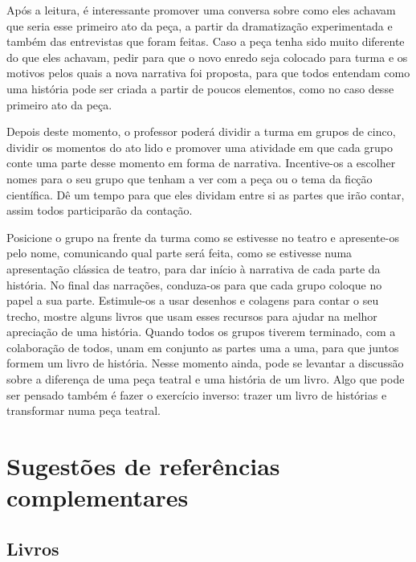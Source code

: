 \documentclass[11pt]{extarticle}
\begin{document}
Após a leitura, é interessante promover uma conversa sobre como eles achavam que seria esse primeiro ato da peça, a partir da dramatização experimentada e também das entrevistas que foram feitas. Caso a peça tenha sido muito diferente do que eles achavam, pedir para que o novo enredo seja colocado para turma e os motivos pelos quais a nova narrativa foi proposta, para que todos entendam como uma história pode ser criada a partir de poucos elementos, como no caso desse primeiro ato da peça.

Depois deste momento, o professor poderá dividir a turma em grupos de cinco, dividir os momentos do ato lido e promover uma atividade em que cada grupo conte uma parte desse momento em forma de narrativa. Incentive-os a escolher nomes para o seu grupo que tenham a ver com a peça ou o tema da ficção científica. Dê um tempo para que eles dividam entre si as partes que irão contar, assim todos participarão da contação.

Posicione o grupo na frente da turma como se estivesse no teatro e apresente-os pelo nome, comunicando qual parte será feita, como se estivesse numa apresentação clássica de teatro, para dar início à narrativa de cada parte da história. No final das narrações, conduza-os para que cada grupo coloque no papel a sua parte. Estimule-os a usar desenhos e colagens para contar o seu trecho, mostre alguns livros que usam esses recursos para ajudar na melhor apreciação de uma história. Quando todos os grupos tiverem terminado, com a colaboração de todos, unam em conjunto as partes uma a uma, para que juntos formem um livro de história. Nesse momento ainda, pode se levantar a discussão sobre a diferença de uma peça teatral e uma história de um livro. Algo que pode ser pensado também é fazer o exercício inverso: trazer um livro de histórias e transformar numa peça teatral. 


\section{Sugestões de referências complementares}

\subsection{Livros} 
\end{document}
